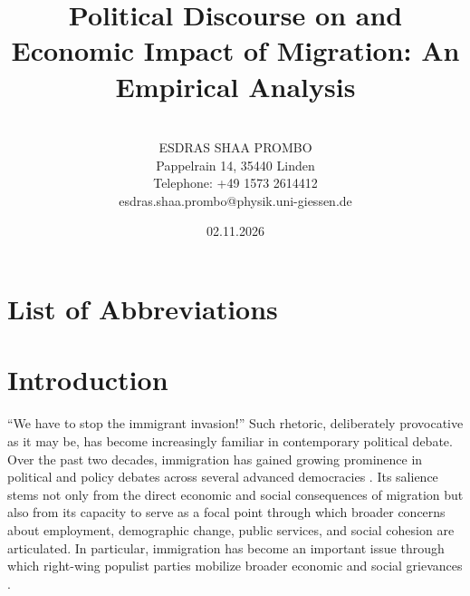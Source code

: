 \documentclass[12pt]{scrartcl}
\title{\Huge Political Discourse on and Economic Impact of Migration: An Empirical Analysis\\[10pt]
}
\author{\\[-10pt] \Large ESDRAS SHAA PROMBO \\ Pappelrain 14, 35440 Linden  \\ Telephone: +49 1573 2614412 \\esdras.shaa.prombo@physik.uni-giessen.de \\[3pt]}
\date{02.11.2026}
\numberwithin{equation}{section}				%
\begin{document}
	
	
	\renewcommand*{\refname}{Bibliography}
	
	\maketitle
	\tableofcontents
	
	\clearpage
	
	\section*{List of Abbreviations}
	\begin{acronym}			
	\end{acronym}
	
	\clearpage
	
	\listoffigures
	\clearpage
	
	\listoftables
	\clearpage
	
	    
    \section{Introduction}
    
    ``We have to stop the immigrant invasion!'' Such rhetoric, deliberately provocative as it may be, has become increasingly familiar in contemporary political debate. Over the past two decades, immigration has gained growing prominence in political and policy debates across several advanced democracies \parencite{ivarsflaten2008unites}. Its salience stems not only from the direct economic and social consequences of migration but also from its capacity to serve as a focal point through which broader concerns about employment, demographic change, public services, and social cohesion are articulated. In particular, immigration has become an important issue through which right-wing populist parties mobilize broader economic and social grievances \parencite{ivarsflaten2008unites,fangmigration}.
    
\end{document}
